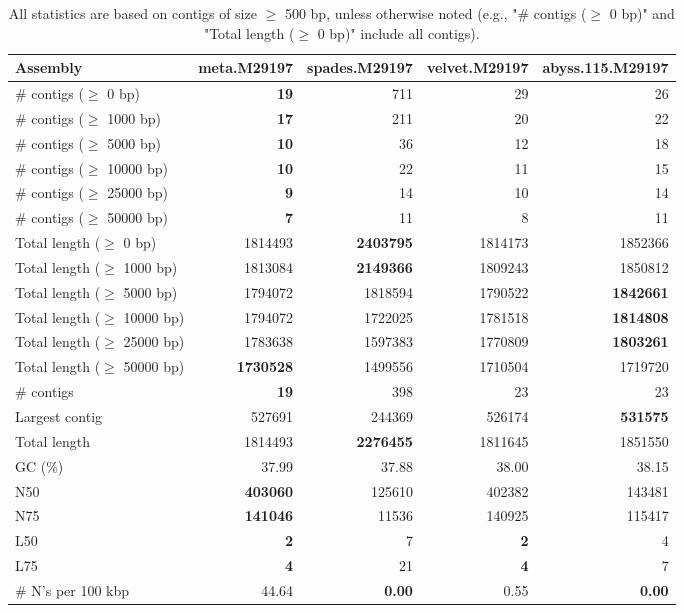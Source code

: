 \documentclass[12pt,a4paper]{article}
\begin{document}
\begin{table}[ht]
\begin{center}
\caption{All statistics are based on contigs of size $\geq$ 500 bp, unless otherwise noted (e.g., "\# contigs ($\geq$ 0 bp)" and "Total length ($\geq$ 0 bp)" include all contigs).}
\begin{tabular}{|l*{4}{|r}|}
\hline
Assembly & meta.M29197 & spades.M29197 & velvet.M29197 & abyss.115.M29197 \\ \hline
\# contigs ($\geq$ 0 bp) & {\bf 19} & 711 & 29 & 26 \\ \hline
\# contigs ($\geq$ 1000 bp) & {\bf 17} & 211 & 20 & 22 \\ \hline
\# contigs ($\geq$ 5000 bp) & {\bf 10} & 36 & 12 & 18 \\ \hline
\# contigs ($\geq$ 10000 bp) & {\bf 10} & 22 & 11 & 15 \\ \hline
\# contigs ($\geq$ 25000 bp) & {\bf 9} & 14 & 10 & 14 \\ \hline
\# contigs ($\geq$ 50000 bp) & {\bf 7} & 11 & 8 & 11 \\ \hline
Total length ($\geq$ 0 bp) & 1814493 & {\bf 2403795} & 1814173 & 1852366 \\ \hline
Total length ($\geq$ 1000 bp) & 1813084 & {\bf 2149366} & 1809243 & 1850812 \\ \hline
Total length ($\geq$ 5000 bp) & 1794072 & 1818594 & 1790522 & {\bf 1842661} \\ \hline
Total length ($\geq$ 10000 bp) & 1794072 & 1722025 & 1781518 & {\bf 1814808} \\ \hline
Total length ($\geq$ 25000 bp) & 1783638 & 1597383 & 1770809 & {\bf 1803261} \\ \hline
Total length ($\geq$ 50000 bp) & {\bf 1730528} & 1499556 & 1710504 & 1719720 \\ \hline
\# contigs & {\bf 19} & 398 & 23 & 23 \\ \hline
Largest contig & 527691 & 244369 & 526174 & {\bf 531575} \\ \hline
Total length & 1814493 & {\bf 2276455} & 1811645 & 1851550 \\ \hline
GC (\%) & 37.99 & 37.88 & 38.00 & 38.15 \\ \hline
N50 & {\bf 403060} & 125610 & 402382 & 143481 \\ \hline
N75 & {\bf 141046} & 11536 & 140925 & 115417 \\ \hline
L50 & {\bf 2} & 7 & {\bf 2} & 4 \\ \hline
L75 & {\bf 4} & 21 & {\bf 4} & 7 \\ \hline
\# N's per 100 kbp & 44.64 & {\bf 0.00} & 0.55 & {\bf 0.00} \\ \hline
\end{tabular}
\end{center}
\end{table}
\end{document}
